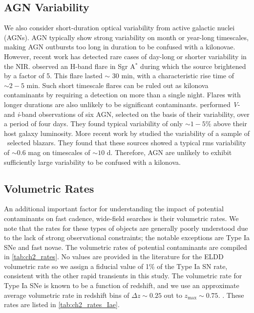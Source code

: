 \subsection{AGN Variability}
\label{sec:ch2_agns}
We also consider short-duration optical variability from active galactic nuclei (AGNs). AGN typically show strong variability on month or year-long timescales, making AGN outbursts too long in duration to be confused with a kilonovae. However, recent work has detected rare cases of day-long  or shorter variability in the NIR. \citet{Genzel+03}  observed an H-band flare in Sgr A$^{*}$ during which the source brightened by a factor of 5. This flare lasted $\sim$ 30 min, with a characteristic rise time of $\sim2-5$ min. Such short timescale flares can be ruled out as kilonova contaminants by requiring a detection on more than a single night. Flares with longer durations are also unlikely to be significant contaminants. \citet{Totani+05} performed {\em V}- and {\em i}-band observations of six AGN, selected on the basis of their variability, over a period of four days. They found typical variability of only $\sim1-5\%$ above their host galaxy luminosity. More recent work by \citet{Ruan+12} studied the variability of a sample of \fermi\ selected blazars. They found that these sources showed a typical rms variability of $\sim0.6$ mag on timescales of $\sim 10$ d. Therefore, AGN are unlikely to exhibit sufficiently large variability to be confused with a kilonova.

\subsection{Volumetric Rates}
\label{sec:ch2_rates}
An additional important factor for understanding the impact of potential contaminants on fast cadence, wide-field searches is their volumetric rates. We note that the rates for these types of objects are generally poorly understood due to the lack of strong observational constraints; the notable exceptions are Type Ia SNe and fast novae. The volumetric rates of potential contaminants are compiled in \cref{tab:ch2_rates}. No values are provided in the literature for the ELDD volumetric rate so we assign a fiducial value of 1\% of the Type Ia SN rate, consistent with the other rapid transients in this study. The volumetric rate for Type Ia SNe is known to be a function of redshift, and we use an approximate average volumetric rate in redshift bins of $\Delta z \sim 0.25$ out to $z_{\text{max}} \sim 0.75$. \citep[][and references therein]{Li+11,Pereira+13,Graur+14}. These rates are listed in \cref{tab:ch2_rates_Iae}.

